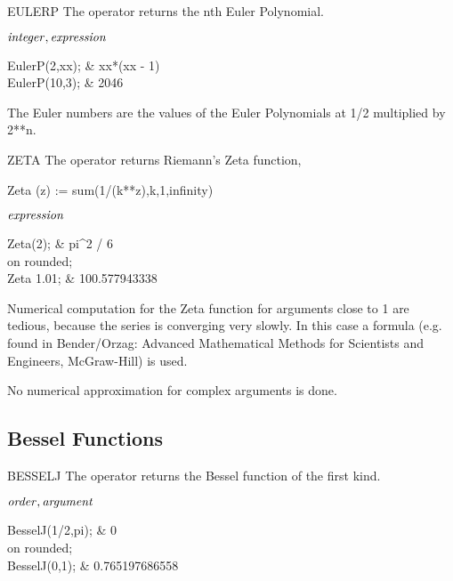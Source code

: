 \begin{Operator}{EULERP}
The  operator returns the nth Euler Polynomial.

\begin{Syntax}
\(\meta{integer},\meta{expression}\)
\end{Syntax}

\begin{Examples}
EulerP(2,xx);            &  xx*(xx - 1) \\
EulerP(10,3);            &  2046
\end{Examples}

\begin{Comments}
The Euler numbers are the values of the Euler Polynomials at 1/2
multiplied by 2**n.
\end{Comments}
\end{Operator}

\begin{Operator}{ZETA}
The  operator returns Riemann's Zeta function, 

  Zeta (z) := sum(1/(k**z),k,1,infinity)

\begin{Syntax}
\(\meta{expression}\)
\end{Syntax}

\begin{Examples}
Zeta(2);                 &  pi^2 / 6 \\
on rounded; \\
Zeta 1.01;               &  100.577943338
\end{Examples}

\begin{Comments}
Numerical computation for the Zeta function for arguments close to 1 are 
tedious, because the series is converging very slowly. In this case a formula
(e.g. found in Bender/Orzag: Advanced Mathematical Methods for
Scientists and Engineers, McGraw-Hill) is used.

No numerical approximation for complex arguments is done.
\end{Comments}

\end{Operator}
\subsection{Bessel Functions}

\begin{Operator}{BESSELJ}
The  operator returns the Bessel function of the first kind.

\begin{Syntax}
\(\meta{order},\meta{argument}\)
\end{Syntax}

\begin{Examples}
BesselJ(1/2,pi);                &       0 \\
on rounded; \\
BesselJ(0,1);                   &        0.765197686558  \\
\end{Examples}

\end{Operator}

